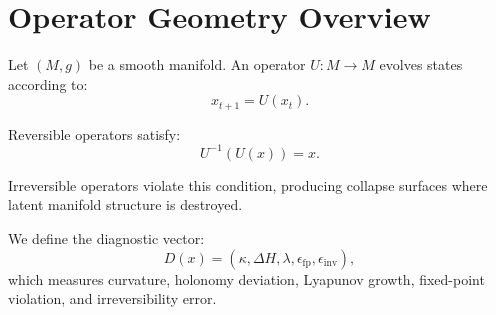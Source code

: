 \section*{Operator Geometry Overview}

Let $(M, g)$ be a smooth manifold. An operator $U : M \to M$ evolves states
according to:
\[
x_{t+1} = U(x_t).
\]

Reversible operators satisfy:
\[
U^{-1}(U(x)) = x.
\]

Irreversible operators violate this condition, producing collapse surfaces where
latent manifold structure is destroyed.

We define the diagnostic vector:
\[
D(x) = (\kappa, \Delta H, \lambda, \epsilon_{\text{fp}}, \epsilon_{\text{inv}}),
\]
which measures curvature, holonomy deviation, Lyapunov growth, fixed-point
violation, and irreversibility error.
